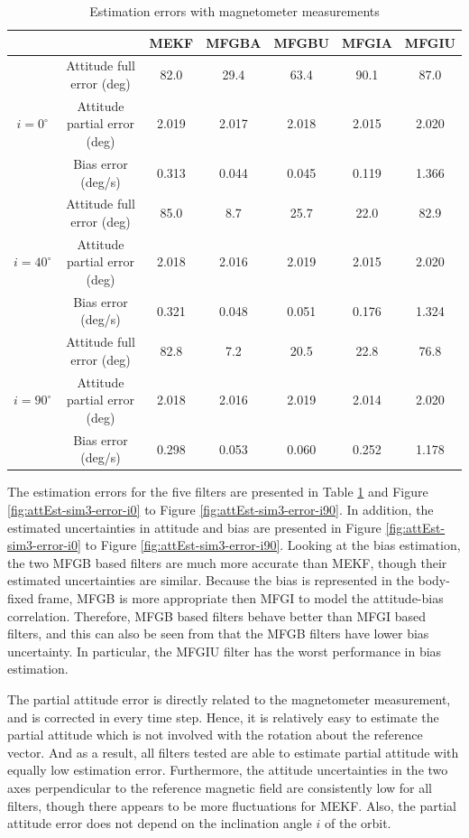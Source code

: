 \begin{table}
	\centering
	\caption{Estimation errors with magnetometer measurements \label{tab:attEst-sim3-estError}}
	\small
	\begin{tabular}{c|c|ccccc}
		\multicolumn{2}{c}{} & MEKF & MFGBA & MFGBU & MFGIA & MFGIU \\ \hline
		\multirow{3}{1.2cm}{$i=0^\circ$} & Attitude full error (deg) & 82.0 & 29.4 & 63.4 & 90.1 & 87.0 \\
		& Attitude partial error (deg) & 2.019 & 2.017 & 2.018 & 2.015 & 2.020 \\
		& Bias error (deg/s) & 0.313 & 0.044 & 0.045 & 0.119 & 1.366 \\ \hline
		\multirow{3}{1.2cm}{$i=40^\circ$} & Attitude full error (deg) & 85.0 & 8.7 & 25.7 & 22.0 & 82.9 \\
		& Attitude partial error (deg) & 2.018 & 2.016 & 2.019 & 2.015 & 2.020 \\
		& Bias error (deg/s) & 0.321 & 0.048 & 0.051 & 0.176 & 1.324 \\ \hline
		\multirow{3}{1.2cm}{$i=90^\circ$} & Attitude full error (deg) & 82.8 & 7.2 & 20.5 & 22.8 & 76.8 \\
		& Attitude partial error (deg) & 2.018 & 2.016 & 2.019 & 2.014 & 2.020 \\
		& Bias error (deg/s) & 0.298 & 0.053 & 0.060 & 0.252 & 1.178 \\ \hline
	\end{tabular}
\end{table}

The estimation errors for the five filters are presented in Table \ref{tab:attEst-sim3-estError} and Figure \ref{fig:attEst-sim3-error-i0} to Figure \ref{fig:attEst-sim3-error-i90}.
In addition, the estimated uncertainties in attitude and bias are presented in Figure \ref{fig:attEst-sim3-error-i0} to Figure \ref{fig:attEst-sim3-error-i90}.
Looking at the bias estimation, the two MFGB based filters are much more accurate than MEKF, though their estimated uncertainties are similar.
Because the bias is represented in the body-fixed frame, MFGB is more appropriate then MFGI to model the attitude-bias correlation.
Therefore, MFGB based filters behave better than MFGI based filters, and this can also be seen from that the MFGB filters have lower bias uncertainty.
In particular, the MFGIU filter has the worst performance in bias estimation.

The partial attitude error is directly related to the magnetometer measurement, and is corrected in every time step.
Hence, it is relatively easy to estimate the partial attitude which is not involved with the rotation about the reference vector.
And as a result, all filters tested are able to estimate partial attitude with equally low estimation error.
Furthermore, the attitude uncertainties in the two axes perpendicular to the reference magnetic field are consistently low for all filters, though there appears to be more fluctuations for MEKF.
Also, the partial attitude error does not depend on the inclination angle $i$ of the orbit.


